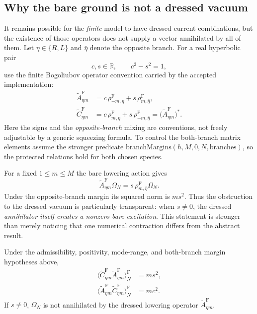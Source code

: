 \subsection{Why the bare ground is not a dressed vacuum}

It remains possible for the \emph{finite} model to have dressed current
combinations, but the existence of those operators does not supply a
vector annihilated by all of them.  Let $\eta\in\{R,L\}$ and
$\bar\eta$ denote the opposite branch.  For a real hyperbolic pair
\begin{equation}
 c,s\in\mathbb R,\qquad c^2-s^2=1,
 \label{eq:ch19-comp-hyperbolic}
\end{equation}
use the finite Bogoliubov operator convention carried by the accepted
implementation:
\begin{align}
 \widetilde A_{\eta m}^{\mathrm F}
 &=c\,\rho_{-m,\eta}^{\mathrm F}
   +s\,\rho_{m,\bar\eta}^{\mathrm F},
 \label{eq:ch19-comp-dressed-ann}\\
 \widetilde C_{\eta m}^{\mathrm F}
 &=c\,\rho_{m,\eta}^{\mathrm F}
   +s\,\rho_{-m,\bar\eta}^{\mathrm F}
 =\bigl(\widetilde A_{\eta m}^{\mathrm F}\bigr)^*.
 \label{eq:ch19-comp-dressed-cre}
\end{align}
Here the signs and the \emph{opposite-branch} mixing are conventions,
not freely adjustable by a generic squeezing formula.  To control the
both-branch matrix elements assume the stronger predicate
$\mathrm{branchMargins}(h,M,0,N,\mathrm{branches})$, so the
protected relations hold for both chosen species.

For a fixed $1\leq m\leq M$ the bare lowering action gives
\begin{equation}
 \widetilde A_{\eta m}^{\mathrm F}\Omega_N
 =s\,\rho_{m,\bar\eta}^{\mathrm F}\Omega_N.
 \label{eq:ch19-comp-ann-action}
\end{equation}
Under the opposite-branch margin its squared norm is $m s^2$.
Thus the obstruction to the dressed vacuum is particularly transparent:
when $s\ne0$, the dressed \emph{annihilator itself creates a nonzero
bare excitation}.  This statement is stronger than merely noticing
that one numerical contraction differs from the abstract result.

\begin{proposition}
\label{prop:ch19-comp-dressed-number}
Under the admissibility, positivity, mode-range, and both-branch margin
hypotheses above,
\begin{align}
 \bigl\langle\widetilde C_{\eta m}^{\mathrm F}
 \widetilde A_{\eta m}^{\mathrm F}\bigr\rangle_N^{\mathrm F}
 &=m s^2,
 \label{eq:ch19-comp-dressed-ca}\\
 \bigl\langle\widetilde A_{\eta m}^{\mathrm F}
 \widetilde C_{\eta m}^{\mathrm F}\bigr\rangle_N^{\mathrm F}
 &=m c^2.
 \label{eq:ch19-comp-dressed-ac}
\end{align}
If $s\ne0$, $\Omega_N$ is not annihilated by the dressed lowering
operator $\widetilde A_{\eta m}^{\mathrm F}$.
\end{proposition}

